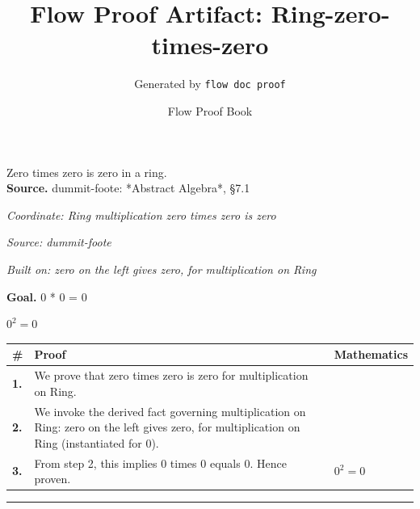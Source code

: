 \documentclass[11pt]{article}
\title{Flow Proof Artifact: Ring-zero-times-zero}
\author{Generated by \texttt{flow doc proof}}
\date{Flow Proof Book}
\theoremstyle{definition}
\begin{document}
\maketitle
Zero times zero is zero in a ring.\\[0.5em]
\textbf{Source.} dummit-foote: *Abstract Algebra*, §7.1\\[0.5em]
\bigskip
{}\par
\smallskip\noindent\textit{Coordinate: Ring \cdot multiplication \cdot zero times zero is zero}\par
\smallskip\noindent\textit{Source: dummit-foote}\par
\smallskip\noindent\textit{Built on: zero on the left gives zero, for multiplication on Ring}\par
\medskip
\noindent\textbf{Goal.} 0 * 0 = 0\par
\noindent$\displaystyle 0^{2} = 0$\par
\medskip
\noindent
\begin{tabular}{@{} >{\raggedright\arraybackslash}p{} >{\raggedright\arraybackslash}p{} >{\raggedleft\arraybackslash}p{} @{}}
\textbf{\#} & \textbf{Proof} & \textbf{Mathematics} \\
\midrule
\textbf{1.} & We prove that zero times zero is zero for multiplication on Ring. & \\[0.45em]
\textbf{2.} & We invoke the derived fact governing multiplication on Ring: zero on the left gives zero, for multiplication on Ring (instantiated for 0). & \\[0.45em]
\textbf{3.} & From step 2, this implies 0 times 0 equals 0. Hence proven. & $\displaystyle 0^{2} = 0$ \\[0.45em]
\bottomrule
\end{tabular}
\label{thm:Ring-multiplication-zero_times_zero_is_zero}
\par\medskip\hrule
\end{document}
